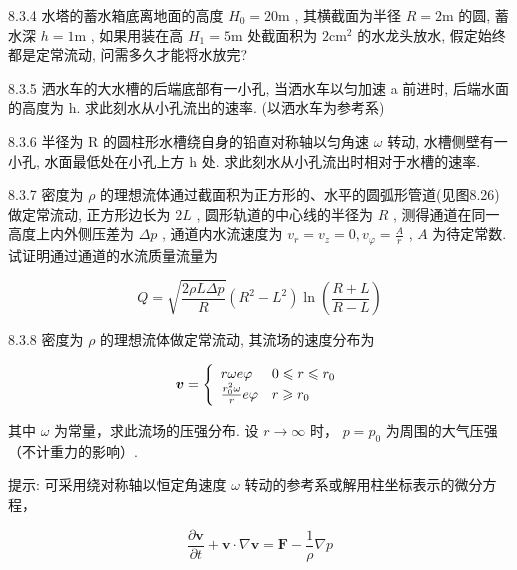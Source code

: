 \begin{problem}{8.3.4}
水塔的蓄水箱底离地面的高度 $H_0 = 20\mathrm{m}$ , 其横截面为半径 $R = 2\mathrm{m}$ 的圆, 蓄水深 $h = 1\mathrm{m}$ , 如果用装在高 $H_1 = 5\mathrm{m}$ 处截面积为 $2\mathrm{cm}^2$ 的水龙头放水, 假定始终都是定常流动, 问需多久才能将水放完?
\end{problem}
\clearpage


\begin{problem}{8.3.5}
洒水车的大水槽的后端底部有一小孔, 当洒水车以匀加速 a 前进时, 后端水面的高度为 h. 求此刻水从小孔流出的速率. (以洒水车为参考系)
\end{problem}
\clearpage


\begin{problem}{8.3.6}
半径为 R 的圆柱形水槽绕自身的铅直对称轴以匀角速 $\omega$ 转动, 水槽侧壁有一小孔, 水面最低处在小孔上方 h 处. 求此刻水从小孔流出时相对于水槽的速率.
\end{problem}
\clearpage


\begin{problem}{8.3.7}
密度为 $\rho$ 的理想流体通过截面积为正方形的、水平的圆弧形管道(见图8.26)做定常流动, 正方形边长为 $2L$ , 圆形轨道的中心线的半径为 $R$ , 测得通道在同一高度上内外侧压差为 $\Delta p$ , 通道内水流速度为 $v_{r} = v_{z} = 0, v_{\varphi} = \frac{A}{r}$ , $A$ 为待定常数. 试证明通过通道的水流质量流量为

\[
Q = \sqrt {\frac {2 \rho L \Delta p}{R}} (R ^ {2} - L ^ {2}) \ln \left(\frac {R + L}{R - L}\right)
\]
\begin{center}

\end{center}
\end{problem}
\clearpage


\begin{problem}{8.3.8}
密度为 $\rho$ 的理想流体做定常流动, 其流场的速度分布为

\[
\boldsymbol {v} = \left\{ \begin{array}{l l} r \omega e \varphi & 0 \leqslant r \leqslant r _ {0} \\ \frac {r _ {0} ^ {2} \omega}{r} e \varphi & r \geqslant r _ {0} \end{array} \right.
\]

其中 $\omega$ 为常量，求此流场的压强分布. 设 $r \to \infty$ 时， $p = p_0$ 为周围的大气压强（不计重力的影响）.

提示: 可采用绕对称轴以恒定角速度 $\omega$ 转动的参考系或解用柱坐标表示的微分方程，

\[
\frac {\partial \boldsymbol {v}}{\partial t} + \boldsymbol {v} \cdot \nabla \boldsymbol {v} = \boldsymbol {F} - \frac {1}{\rho} \nabla p
\]
\end{problem}
\clearpage


